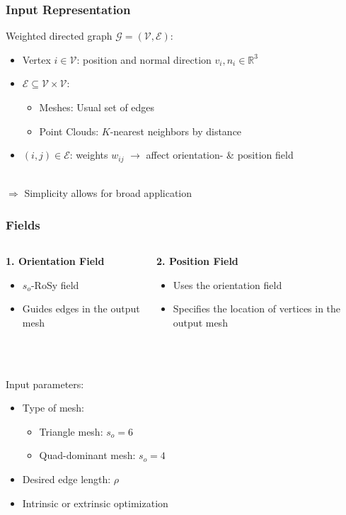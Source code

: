\documentclass[aspectratio=43,sanserif,professionalfonts]{beamer}
\begin{document}
\begin{frame}
	\frametitle{Input Representation}
	Weighted directed graph $\mathcal{G} = (\mathcal{V}, \mathcal{E})$:
	\begin{itemize}
		\item	Vertex $i \in \mathcal{V}$: position and normal direction $v_i, n_i \in \mathbb{R}^3$
		\pause
		\item	$\mathcal{E} \subseteq \mathcal{V} \times \mathcal{V}$:
				\begin{itemize}
					\item	Meshes: Usual set of edges
					\item	Point Clouds: $K$-nearest neighbors by distance
				\end{itemize}
		\pause
		\item	$(i,j) \in \mathcal{E}$: weights $w_{ij}$ $\rightarrow$ affect orientation- \& position field
	\end{itemize}
	\pause
	~\\
	$\Rightarrow$ Simplicity allows for broad application
\end{frame}

\begin{frame}
	\frametitle{Fields}
	\begin{columns}
		\begin{column}{0.5\textwidth}
			\textbf{1. Orientation Field}\\
			\begin{itemize}
				\item	$s_o$-RoSy field
				\item	Guides edges in the output mesh
			\end{itemize}
		\end{column}
		\pause
		\begin{column}{0.5\textwidth}
			\textbf{2. Position Field}\\
			\begin{itemize}
				\item	Uses the orientation field
				\item	Specifies the location of vertices in the output mesh
			\end{itemize}
		\end{column}
	\end{columns}
	\pause
	~\\~\\
	Input parameters:
	\begin{itemize}
		\item	Type of mesh:
				\begin{itemize}
					\item	Triangle mesh: $s_o=6$
					\item	Quad-dominant mesh: $s_o=4$
				\end{itemize}
		\item	Desired edge length: $\rho$
		\item	Intrinsic or extrinsic optimization
	\end{itemize}
\end{frame}
\end{document}
